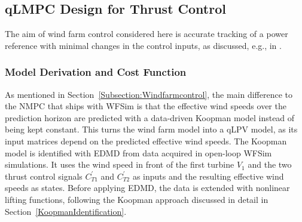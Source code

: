 \subsection{qLMPC Design for Thrust Control}
The aim of wind farm control considered here is accurate tracking of a power reference with minimal changes in the control inputs, as discussed, e.g., in \cite{vali2019adjoint, boersma2019constrained}.
\subsubsection{Model Derivation and Cost Function}
As mentioned in Section~\ref{Subsection:Windfarmcontrol}, the main difference to the NMPC that ships with WFSim is that the effective wind speeds over the prediction horizon are predicted with a data-driven Koopman model instead of being kept constant. This turns the wind farm model into a qLPV model, as its input matrices depend on the predicted effective wind speeds. The Koopman model is identified with EDMD from data acquired in open-loop WFSim simulations. It uses the wind speed in front of the first turbine $V_1$ and the two thrust control signals $C_{T1}^{\prime}$ and $C_{T2}^{\prime}$ as inputs and the resulting effective wind speeds as states. Before applying EDMD, the data is extended with nonlinear lifting functions, following the Koopman approach discussed in detail in Section~\ref{KoopmanIdentification}.

